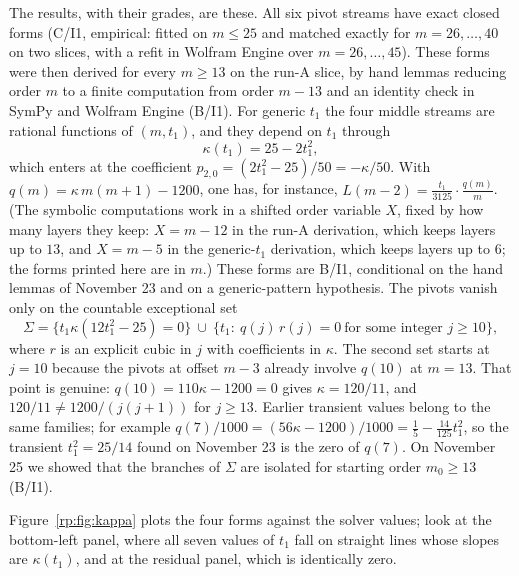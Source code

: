 \documentclass[a4paper,11pt]{article}
\theoremstyle{jsplain}
\theoremstyle{jsdef}
\theoremstyle{jsrem}
\begin{document}
The results, with their grades, are these. All six pivot streams have exact closed forms (C/I1, empirical: fitted on $m\le25$ and matched exactly for $m=26,\dots,40$ on two slices, with a refit in Wolfram Engine over $m=26,\dots,45$). These forms were then derived for every $m\ge13$ on the run-A slice, by hand lemmas reducing order $m$ to a finite computation from order $m-13$ and an identity check in SymPy and Wolfram Engine (B/I1). For generic $t_1$ the four middle streams are rational functions of $(m,t_1)$, and they depend on $t_1$ through
\[
\kappa(t_1)=25-2t_1^2 ,
\]
which enters at the coefficient $p_{2,0}=(2t_1^2-25)/50=-\kappa/50$. With $q(m)=\kappa\,m(m+1)-1200$, one has, for instance, $L(m-2)=\frac{t_1}{3125}\cdot\frac{q(m)}{m}$. (The symbolic computations work in a shifted order variable $X$, fixed by how many layers they keep: $X=m-12$ in the run-A derivation, which keeps layers up to $13$, and $X=m-5$ in the generic-$t_1$ derivation, which keeps layers up to $6$; the forms printed here are in $m$.) These forms are B/I1, conditional on the hand lemmas of November 23 and on a generic-pattern hypothesis. The pivots vanish only on the countable exceptional set
\[
\Sigma=\{t_1\kappa(12t_1^2-25)=0\}\ \cup\ \{t_1:\ q(j)\,r(j)=0\ \text{for some integer } j\ge10\},
\]
where $r$ is an explicit cubic in $j$ with coefficients in $\kappa$. The second set starts at $j=10$ because the pivots at offset $m-3$ already involve $q(10)$ at $m=13$. That point is genuine: $q(10)=110\kappa-1200=0$ gives $\kappa=120/11$, and $120/11\ne1200/(j(j+1))$ for $j\ge13$. Earlier transient values belong to the same families; for example $q(7)/1000=(56\kappa-1200)/1000=\tfrac15-\tfrac{14}{125}t_1^2$, so the transient $t_1^2=25/14$ found on November 23 is the zero of $q(7)$. On November 25 we showed that the branches of $\Sigma$ are isolated for starting order $m_0\ge13$ (B/I1).

Figure~\ref{rp:fig:kappa} plots the four forms against the solver values; look at the bottom-left panel, where all seven values of $t_1$ fall on straight lines whose slopes are $\kappa(t_1)$, and at the residual panel, which is identically zero.
\end{document}

